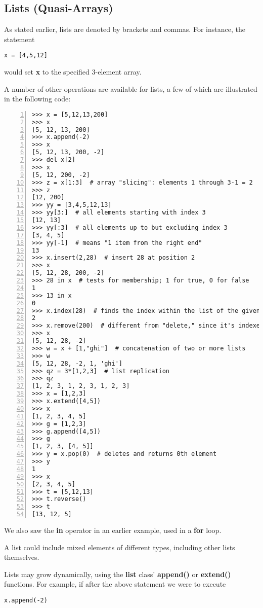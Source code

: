 \subsection{Lists (Quasi-Arrays)}

As stated earlier, lists are denoted by brackets and commas.  For
instance, the statement

\begin{Verbatim}[fontsize=\relsize{-2}]
x = [4,5,12]
\end{Verbatim}

would set {\bf x} to the specified 3-element array.  

A number of other operations are available for lists, a few of which are
illustrated in the following code:  

\begin{Verbatim}[fontsize=\relsize{-2},numbers=left]
>>> x = [5,12,13,200]
>>> x
[5, 12, 13, 200]
>>> x.append(-2)
>>> x
[5, 12, 13, 200, -2]
>>> del x[2]
>>> x
[5, 12, 200, -2]
>>> z = x[1:3]  # array "slicing": elements 1 through 3-1 = 2
>>> z
[12, 200]
>>> yy = [3,4,5,12,13]
>>> yy[3:]  # all elements starting with index 3
[12, 13]
>>> yy[:3]  # all elements up to but excluding index 3
[3, 4, 5]
>>> yy[-1]  # means "1 item from the right end"
13
>>> x.insert(2,28)  # insert 28 at position 2
>>> x
[5, 12, 28, 200, -2]
>>> 28 in x  # tests for membership; 1 for true, 0 for false 
1
>>> 13 in x
0
>>> x.index(28)  # finds the index within the list of the given value
2
>>> x.remove(200)  # different from "delete," since it's indexed by value
>>> x
[5, 12, 28, -2]
>>> w = x + [1,"ghi"]  # concatenation of two or more lists
>>> w
[5, 12, 28, -2, 1, 'ghi']
>>> qz = 3*[1,2,3]  # list replication
>>> qz
[1, 2, 3, 1, 2, 3, 1, 2, 3]
>>> x = [1,2,3]
>>> x.extend([4,5])
>>> x
[1, 2, 3, 4, 5]
>>> g = [1,2,3]
>>> g.append([4,5])
>>> g
[1, 2, 3, [4, 5]]
>>> y = x.pop(0)  # deletes and returns 0th element
>>> y
1
>>> x
[2, 3, 4, 5]
>>> t = [5,12,13]
>>> t.reverse()
>>> t
[13, 12, 5]
\end{Verbatim}

We also saw the {\bf in} operator in an earlier example, used in a {\bf
for} loop.

A list could include mixed elements of different types, including other
lists themselves.

Lists may grow dynamically, using the {\bf list} class' {\bf append()}
or {\bf extend()} functions.  For example, if after the above statement
we were to execute

\begin{Verbatim}[fontsize=\relsize{-2}]
x.append(-2)
\end{Verbatim}

